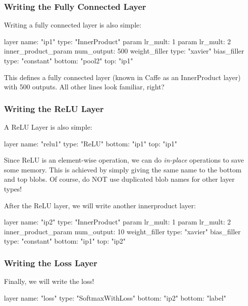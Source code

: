 \subsubsection*{Writing the Fully Connected Layer}

Writing a fully connected layer is also simple\+: \begin{DoxyVerb}layer {
  name: "ip1"
  type: "InnerProduct"
  param { lr_mult: 1 }
  param { lr_mult: 2 }
  inner_product_param {
    num_output: 500
    weight_filler {
      type: "xavier"
    }
    bias_filler {
      type: "constant"
    }
  }
  bottom: "pool2"
  top: "ip1"
}
\end{DoxyVerb}


This defines a fully connected layer (known in Caffe as an {\ttfamily Inner\+Product} layer) with 500 outputs. All other lines look familiar, right?

\subsubsection*{Writing the Re\+LU Layer}

A Re\+LU Layer is also simple\+: \begin{DoxyVerb}layer {
  name: "relu1"
  type: "ReLU"
  bottom: "ip1"
  top: "ip1"
}
\end{DoxyVerb}


Since Re\+LU is an element-\/wise operation, we can do {\itshape in-\/place} operations to save some memory. This is achieved by simply giving the same name to the bottom and top blobs. Of course, do N\+OT use duplicated blob names for other layer types!

After the Re\+LU layer, we will write another innerproduct layer\+: \begin{DoxyVerb}layer {
  name: "ip2"
  type: "InnerProduct"
  param { lr_mult: 1 }
  param { lr_mult: 2 }
  inner_product_param {
    num_output: 10
    weight_filler {
      type: "xavier"
    }
    bias_filler {
      type: "constant"
    }
  }
  bottom: "ip1"
  top: "ip2"
}
\end{DoxyVerb}


\subsubsection*{Writing the Loss Layer}

Finally, we will write the loss! \begin{DoxyVerb}layer {
  name: "loss"
  type: "SoftmaxWithLoss"
  bottom: "ip2"
  bottom: "label"
}
\end{DoxyVerb}



